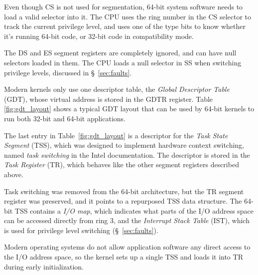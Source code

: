Even though CS is not used for segmentation, 64-bit system software needs to
load a valid selector into it. The CPU uses the ring number in the CS selector
to track the current privilege level, and uses one of the type bits to know
whether it's running 64-bit code, or 32-bit code in compatibility mode.


The DS and ES segment registers are completely ignored, and can have null
selectors loaded in them. The CPU loads a null selector in SS when switching
privilege levels, discussed in \S~\ref{sec:faults}.


Modern kernels only use one descriptor table, the \textit{Global Descriptor
Table} (GDT), whose virtual address is stored in the GDTR register. Table~
\ref{fig:gdt_layout} shows a typical GDT layout that can be used by 64-bit
kernels to run both 32-bit and 64-bit applications.

\begin{table}[hbt]
  \caption{
    A typical GDT layout in the 64-bit Intel Architecture.
  }
  \label{fig:gdt_layout}
\end{table}


The last entry in Table~\ref{fig:gdt_layout} is a descriptor for the
\textit{Task State Segment} (TSS), which was designed to implement hardware
context switching, named \textit{task switching} in the Intel documentation.
The descriptor is stored in the \textit{Task Register} (TR), which behaves like
the other segment registers described above.

Task switching was removed from the 64-bit architecture, but the TR segment
register was preserved, and it points to a repurposed TSS data structure. The
64-bit TSS contains a \textit{I/O map}, which indicates what parts of the I/O
address space can be accessed directly from ring 3, and the
\textit{Interrupt Stack Table} (IST), which is used for privilege level
switching (\S~\ref{sec:faults}).

Modern operating systems do not allow application software any direct access to
the I/O address space, so the kernel sets up a single TSS and loads it into TR
during early initialization.
